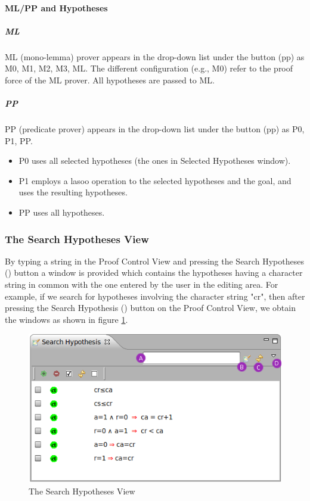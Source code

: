 \paragraph{ML/PP and Hypotheses}

\subparagraph{ML}

ML (mono-lemma) prover appears in the drop-down list under the button (pp) as M0, M1, M2, M3, ML. The different configuration (e.g., M0) refer to the proof force of the ML prover. All hypotheses are passed to ML.

\subparagraph{PP}

PP (predicate prover) appears in the drop-down list under the button (pp) as P0, P1, PP.

\begin{itemize}
	\item P0 uses all selected hypotheses (the ones in Selected Hypotheses window).
	\item P1 employs a lasoo operation to the selected hypotheses and the goal, and uses the resulting hypotheses.
	\item PP uses all hypotheses. 
\end{itemize}

\subsubsection{The Search Hypotheses View}

By typing a string in the \textsf{Proof Control View} and pressing the Search Hypotheses () button a window is provided which contains the hypotheses having a character string in common with the one entered by the user in the editing area. For example, if we search for hypotheses involving the character string "cr", then after pressing the Search Hypothesis () button on the \textsf{Proof Control View}, we obtain the windows as shown in figure \ref{fig_ref_01_proving_perspective7}. 

\begin{figure}[!h]
\begin{center}
	\includegraphics{img/reference/ref_01_proving_perspective7.png}
	\caption{The Search Hypotheses View}
	\label{fig_ref_01_proving_perspective7}
\end{center}
\end{figure}

